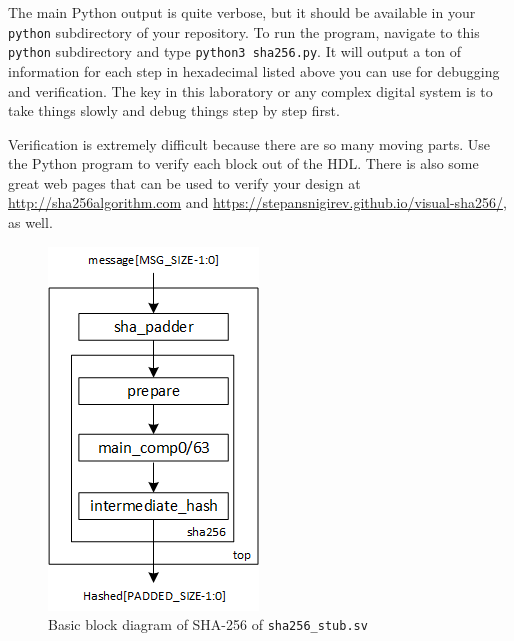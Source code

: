 \documentclass{article}
\begin{document}
The main Python output is quite verbose, but it should be available in
your \verb!python! subdirectory of your repository.  To run the program,
navigate to this \verb!python! subdirectory and type
\verb!python3 sha256.py!.  It will output a ton of information for
each step in hexadecimal listed above you can use for debugging and
verification.  The
key in this laboratory or any complex digital system
is to take things slowly and debug things step by step first.  

Verification is extremely difficult
because there are so many moving parts.  Use the
Python program to verify each block out of the HDL.  There is also some
great web pages that can be used to verify your design at
\url{http://sha256algorithm.com} and
\url{https://stepansnigirev.github.io/visual-sha256/}, as well.
\begin{figure} [t!]
  \centering
  \includegraphics[scale=0.9]{sha256-block.png}
  \caption{Basic block diagram of SHA-256 of \texttt{sha256\_stub.sv}}
  \label{sha256-block.fig}
\end{figure}
\end{document}
